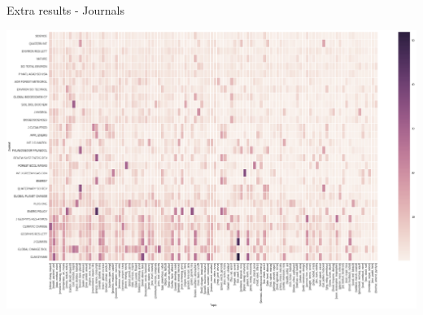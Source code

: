 \documentclass[9pt]{beamer}
\begin{document}
\begin{frame}{Extra results - Journals}

	\includegraphics[width=\linewidth]{../plots/journals/journal_topics_386.png}

\end{frame}
\end{document}

